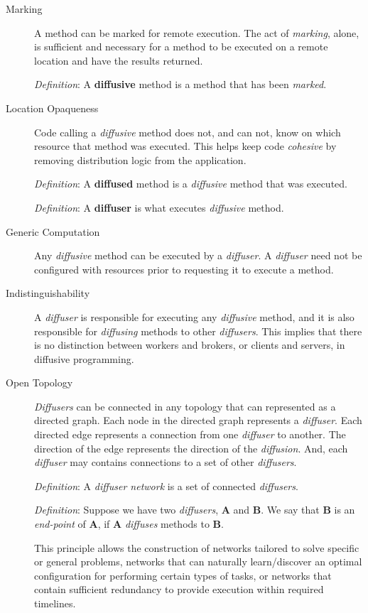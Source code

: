 \documentclass[11pt]{article}
\begin{document}
\begin{description}

	\item[Marking] 
	A method can be marked for remote execution. The act of \emph{marking}, alone, is sufficient and necessary for a method to be executed on a remote location and have the results returned. 
	
	\emph{Definition}: A \textbf{diffusive} method is a method that has been \emph{marked}.

	\item[Location Opaqueness]
	Code calling a \emph{diffusive} method does not, and can not, know on which resource that method was executed. This helps keep code \emph{cohesive} by removing distribution logic from the application. 
	
	\emph{Definition}: A \textbf{diffused} method is a \emph{diffusive} method that was executed. 
	
	\emph{Definition}: A \textbf{diffuser} is what executes \emph{diffusive} method.
	
	\item[Generic Computation]
	Any \emph{diffusive} method can be executed by a \emph{diffuser}. A \emph{diffuser} need not be configured with resources prior to requesting it to execute a method.
	
	\item[Indistinguishability]
	A \emph{diffuser} is responsible for executing any \emph{diffusive} method, and it is also responsible for \emph{diffusing} methods to other \emph{diffusers}. This implies that there is no distinction between workers and brokers, or clients and servers, in diffusive programming.
	
	\item[Open Topology]
	\emph{Diffusers} can be connected in any topology that can represented as a directed graph. Each node in the directed graph represents a \emph{diffuser}. Each directed edge represents a connection from one \emph{diffuser} to another. The direction of the edge represents the direction of the \emph{diffusion}. And, each \emph{diffuser} may contains connections to a set of other \emph{diffusers}. 
	
	\emph{Definition}: A \emph{diffuser network} is a set of connected \emph{diffusers}.
	
	\emph{Definition}: Suppose we have two \emph{diffusers}, \textbf{A} and \textbf{B}. We say that \textbf{B} is an \emph{end-point} of \textbf{A}, if \textbf{A} \emph{diffuses} methods to \textbf{B}.
	
	This principle allows the construction of networks tailored to solve specific or general problems, networks that can naturally learn/discover an optimal configuration for performing certain types of tasks, or networks that contain sufficient redundancy to provide execution within required timelines.

\end{description}
\end{document}
